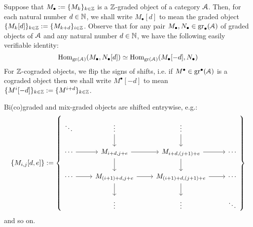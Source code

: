             \begin{convention}[Shifts] \label{conv: shifts_of_graded_objects}
                Suppose that $M_{\bullet} := \{M_k\}_{k \in \mathbb{Z}}$ is a $\mathbb{Z}$-graded object of a category $\mathcal{A}$. Then, for each natural number $d \in \mathbb{N}$, we shall write $M_{\bullet}[d]$ to mean the graded object $\{M_k[d]\}_{k \in \mathbb{Z}} := \{M_{k + d}\}_{i \in \mathbb{Z}}$. Observe that for any pair $M_{\bullet}, N_{\bullet} \in \operatorname{gr}_{\bullet}(\mathcal{A})$ of graded objects of $\mathcal{A}$ and any natural number $d \in \mathbb{N}$, we have the following easily verifiable identity:
                    $$\mathrm{Hom}_{\operatorname{gr}(\mathcal{A})}(M_{\bullet}, N_{\bullet}[d]) \simeq \mathrm{Hom}_{\operatorname{gr}(\mathcal{A})}(M_{\bullet}[-d], N_{\bullet})$$
                For $\mathbb{Z}$-cograded objects, we flip the signs of shifts, i.e. if $M^{\bullet} \in \operatorname{gr}^{\bullet}(\mathcal{A})$ is a cograded object then we shall write $M^{\bullet}[-d]$ to mean $\{M^i[-d]\}_{k \in \mathbb{Z}} := \{M^{i + d}\}_{k \in \mathbb{Z}}$.
                
                Bi(co)graded and mix-graded objects are shifted entrywise, e.g.:
                    $$
                        \{M_{i, j}[d, e]\} := 
                        \left\{
                            \begin{tikzcd}
                        	\ddots & \vdots & \vdots \\
                        	\cdots & {M_{i + d, j + e}} & {M_{i + d, (j + 1) + e}} & \cdots \\
                        	\cdots & {M_{(i + 1) + d, j + e}} & {M_{(i + 1) + d, (j + 1) + e}} & \cdots \\
                        	& \vdots & \vdots & \ddots
                        	\arrow[from=2-2, to=3-2]
                        	\arrow[from=3-2, to=4-2]
                        	\arrow[from=3-3, to=4-3]
                        	\arrow[from=2-3, to=3-3]
                        	\arrow[from=2-2, to=2-3]
                        	\arrow[from=3-2, to=3-3]
                        	\arrow[from=3-3, to=3-4]
                        	\arrow[from=2-3, to=2-4]
                        	\arrow[from=2-1, to=2-2]
                        	\arrow[from=1-2, to=2-2]
                        	\arrow[from=1-3, to=2-3]
                        	\arrow[from=3-1, to=3-2]
                        \end{tikzcd}
                        \right\}
                    $$
                and so on.
            \end{convention}
            
